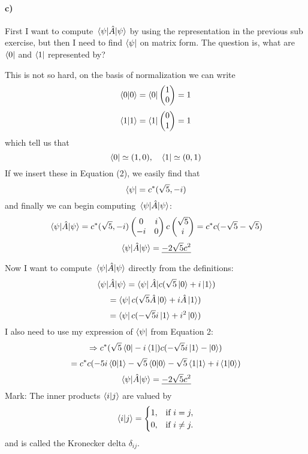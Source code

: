 \documentclass{scrartcl}
\begin{document}
\paragraph{c)}
First I want to compute $\expval{\hat{A}}{\psi}$ by using the representation in the previous sub exercise, but then I need to find $\bra{\psi}$ on matrix form. The question is, what are $\bra{0}$ and $\bra{1}$ represented by?\par \vspace{3mm}
This is not so hard, on the basis of normalization we can write
$$\braket{0}{0}=\bra{0}\begin{pmatrix}1\\0\end{pmatrix}=1$$
$$\braket{1}{1}=\bra{1}\begin{pmatrix}0\\1\end{pmatrix}=1$$
which tell us that 
$$\bra{0}\simeq(1,0),\quad\bra{1}\simeq(0,1)$$
If we insert these in Equation (2), we easily find that
$$\bra{\psi}=c^*(\sqrt{5},-i)$$
and finally we can begin computing $\expval{\hat{A}}{\psi}$:
\begin{equation*}
\expval{\hat{A}}{\psi}=c^*(\sqrt{5},-i)\begin{pmatrix}0&i\\-i&0\end{pmatrix}
c\begin{pmatrix}\sqrt{5}\\i\end{pmatrix}=c^*c(-\sqrt{5}-\sqrt{5})
\end{equation*}
$$\expval{\hat{A}}{\psi}=\underline{-2\sqrt{5}c^2}$$\par \vspace{5mm}
Now I want to compute $\expval{\hat{A}}{\psi}$ directly from the definitions:
$$\expval{\hat{A}}{\psi}=\bra{\psi}\hat{A}|c(\sqrt{5}\ket{0}+i\ket{1})$$
$$=\bra{\psi}c(\sqrt{5}\hat{A}\ket{0}+i\hat{A}\ket{1})$$
$$=\bra{\psi}c(-\sqrt{5}i\ket{1}+i^2\ket{0})$$
I also need to use my expression of $\bra{\psi}$ from Equation 2:
$$\Rightarrow c^*(\sqrt{5}\bra{0}-i\bra{1})c(-\sqrt{5}i\ket{1}-\ket{0})$$
$$=c^*c(-5i\braket{0}{1}-\sqrt{5}\braket{0}{0}-\sqrt{5}\braket{1}{1}+i\braket{1}{0})$$
$$\expval{\hat{A}}{\psi}=\underline{-2\sqrt{5}c^2}$$
\vspace{5mm}
Mark: The inner products $\braket{i}{j}$ are valued by
\begin{equation}
\braket{i}{j} =
    \begin{cases}
            1, &         \text{if } i=j,\\
            0, &         \text{if } i\neq j.
    \end{cases}
\end{equation}
and is called the Kronecker delta $\delta_{ij}$.
 
\end{document}
